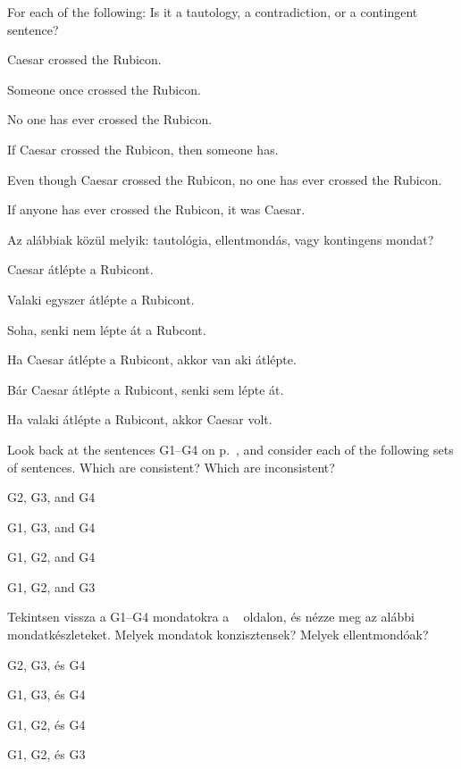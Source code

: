 \problempart
\label{pr.EnglishTautology}
For each of the following: Is it a tautology, a contradiction, or a contingent sentence?
\begin{earg}
\item Caesar crossed the Rubicon.
\item Someone once crossed the Rubicon.
\item No one has ever crossed the Rubicon.
\item If Caesar crossed the Rubicon, then someone has.
\item Even though Caesar crossed the Rubicon, no one has ever crossed the Rubicon.
\item If anyone has ever crossed the Rubicon, it was Caesar.
\end{earg}

\problempart
\label{pr.EnglishTautology}
Az alábbiak közül melyik: tautológia, ellentmondás, vagy kontingens mondat?
\begin{earg}
\item Caesar átlépte a Rubicont.
\item Valaki egyszer átlépte a Rubicont.
\item Soha, senki nem lépte át a Rubcont.
\item Ha Caesar átlépte a Rubicont, akkor van aki átlépte.
\item Bár Caesar átlépte a Rubicont, senki sem lépte át.
\item Ha valaki átlépte a Rubicont, akkor Caesar volt.
\end{earg}

\solutions
\problempart
\label{pr.MartianGiraffes}
Look back at the sentences G1--G4 on p.~\pageref{MartianGiraffes}, and consider each of the following sets of sentences. Which are consistent? Which are inconsistent?
\begin{earg}
\item G2, G3, and G4
\item G1, G3, and G4
\item G1, G2, and G4
\item G1, G2, and G3
\end{earg}

\solutions
\problempart
\label{pr.MartianGiraffes}
Tekintsen vissza a G1--G4 mondatokra a ~\pageref{MartianGiraffes} oldalon, és nézze meg az alábbi mondatkészleteket. Melyek mondatok konzisztensek? Melyek ellentmondóak?
\begin{earg}
\item G2, G3, és G4
\item G1, G3, és G4
\item G1, G2, és G4
\item G1, G2, és G3
\end{earg}


